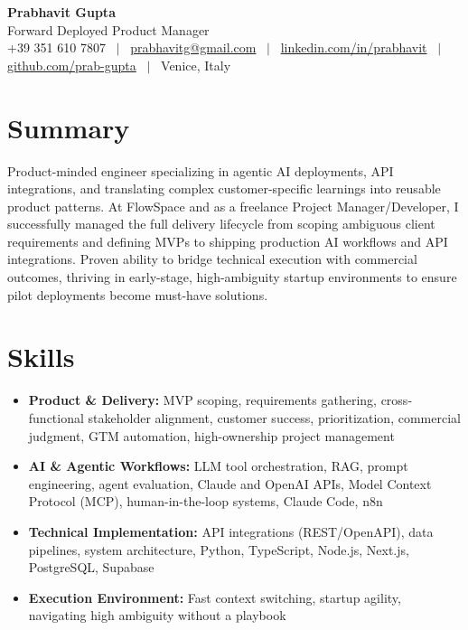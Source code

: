 \documentclass[a4paper,10pt]{article}
\begin{document}
\begin{minipage}[c]{0.80\textwidth}
 {\Huge\bfseries Prabhavit Gupta}\\[3pt]
 {\color{accent}\large Forward Deployed Product Manager}\\[6pt]
 {\footnotesize +39 351 610 7807 ~$\vert$~
 \href{mailto:prabhavitg@gmail.com}{prabhavitg@gmail.com} ~$\vert$~
 \href{https://www.linkedin.com/in/prabhavit/}{linkedin.com/in/prabhavit} ~$\vert$~
 \href{https://github.com/prab-gupta}{github.com/prab-gupta} ~$\vert$~
 Venice, Italy}
\end{minipage}\hfill
\begin{minipage}[c]{0.18\textwidth}
\end{minipage}
\vspace{-2pt}

\section{Summary}
Product-minded engineer specializing in agentic AI deployments, API integrations, and translating complex customer-specific learnings into reusable product patterns. At FlowSpace and as a freelance Project Manager/Developer, I successfully managed the full delivery lifecycle from scoping ambiguous client requirements and defining MVPs to shipping production AI workflows and API integrations. Proven ability to bridge technical execution with commercial outcomes, thriving in early-stage, high-ambiguity startup environments to ensure pilot deployments become must-have solutions.

\section{Skills}
\begin{itemize}
 \item \textbf{Product \& Delivery:} MVP scoping, requirements gathering, cross-functional stakeholder alignment, customer success, prioritization, commercial judgment, GTM automation, high-ownership project management
 \item \textbf{AI \& Agentic Workflows:} LLM tool orchestration, RAG, prompt engineering, agent evaluation, Claude and OpenAI APIs, Model Context Protocol (MCP), human-in-the-loop systems, Claude Code, n8n
 \item \textbf{Technical Implementation:} API integrations (REST/OpenAPI), data pipelines, system architecture, Python, TypeScript, Node.js, Next.js, PostgreSQL, Supabase
 \item \textbf{Execution Environment:} Fast context switching, startup agility, navigating high ambiguity without a playbook
\end{itemize}
\end{document}
